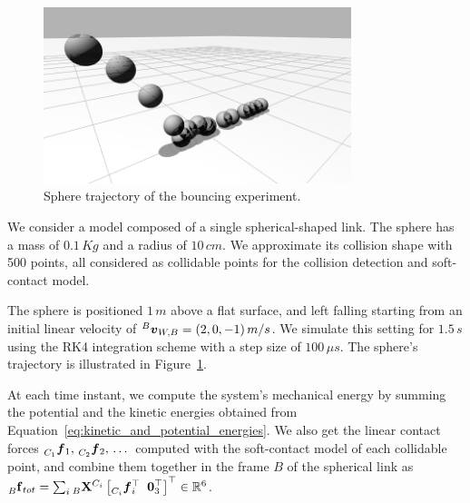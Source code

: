 \begin{figure}
    \centering
    \includegraphics[width=0.8\textwidth]{images/contributions/chapter_7/bouncing_ball_trajectory.png}
    \caption{Sphere trajectory of the bouncing experiment.}
    \label{fig:bouncing_ball_trajectory}
\end{figure}

We consider a model composed of a single spherical-shaped link.
The sphere has a mass of $0.1 \, Kg$ and a radius of $10 \, cm$.
We approximate its collision shape with 500 points, all considered as collidable points for the collision detection and soft-contact model.

The sphere is positioned $1 \, m$ above a flat surface, and left falling starting from an initial linear velocity of $\vellin[B]_{W,B} = (2, 0, -1) \, m/s$.
We simulate this setting for $1.5 \, s$ using the \ac{RK4} integration scheme with a step size of $100 \, \mu s$.
The sphere's trajectory is illustrated in Figure~\ref{fig:bouncing_ball_trajectory}.

At each time instant, we compute the system's mechanical energy by summing the potential and the kinetic energies obtained from Equation~\eqref{eq:kinetic_and_potential_energies}.
We also get the linear contact forces $\forcelin[C_1]_1, \, \forcelin[C_2]_2, \, \dots$ computed with the soft-contact model of each collidable point, and combine them together in the frame $B$ of the spherical link as $\forcesix[B]_{tot} = \sum_i \transfor[B]^{C_i} \left[ \forcelin[C_i]_i^\top \;\; \zeros_3^\top \right]^\top \in \realn^6$.

